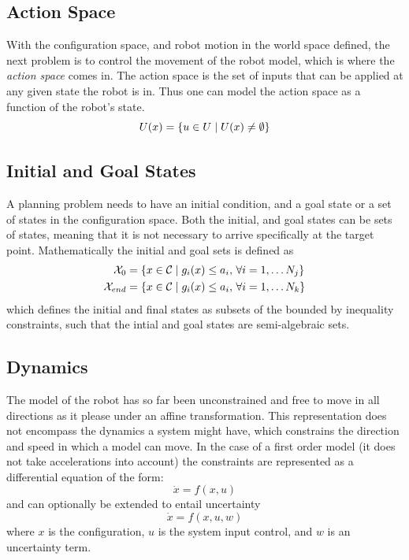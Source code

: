 \subsection{Action Space}

With the configuration space, and robot motion in the world space defined, the
next problem is to control the movement of the robot model, which is where the
\textit{action space} comes in. The action space is the set of inputs that can
be applied at any given state the robot is in. Thus one can model the action
space as a function of the robot's state.
\[
  U(x) = \lbrace u \in U \mid U(x)
    \neq \emptyset \rbrace
\]

\subsection{Initial and Goal States}

A planning problem needs to have an initial condition, and a goal state or a set
of states in the configuration space. Both the initial, and goal states can be
sets of states, meaning that it is not necessary to arrive specifically at the
target point. Mathematically the initial and goal sets is defined as
\begin{align*}
  \mathcal{X}_0 &= \lbrace x \in \mathcal{C}{} \mid g_i(x) \leq a_i,
    \, \forall i = 1,\ldots N_j\rbrace \\
  \mathcal{X}_{end} &= \lbrace x \in \mathcal{C}{} \mid g_i(x) \leq
    a_i, \, \forall i = 1,\ldots N_k\rbrace
\end{align*}
which defines the initial and final states as subsets of the
\modelconfigurationspace{} bounded by inequality constraints, such that the
intial and goal states are semi-algebraic sets.

\subsection{Dynamics}

The model of the robot has so far been unconstrained and free to move in all
directions as it please under an affine transformation. This representation does
not encompass the dynamics a system might have, which constrains the direction
and speed in which a model can move. In the case of a first order model (\ie it
does not take accelerations into account) the constraints are represented as a
differential equation of the form:
\[
  \dot{x} = f(x,u)
\]
and can optionally be extended to entail uncertainty
\[
  \dot{x} = f(x,u,w)
\]
where \(x\) is the configuration, \(u\) is the system input control, and \(w\)
is an uncertainty term.

